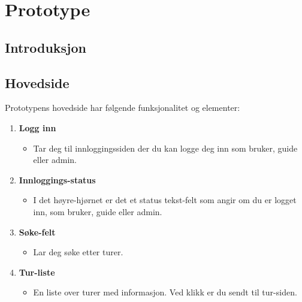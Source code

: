\documentclass[../doc]{subfiles}
\begin{document}
\section{Prototype}
\subsection{Introduksjon}

\subsection{Hovedside}
Prototypens hovedside har følgende funksjonalitet og elementer:

\begin{enumerate}
    \item \textbf{Logg inn}
    \begin{itemize}
        \item Tar deg til innloggingssiden der du kan logge deg inn som bruker, guide eller admin.
    \end{itemize}

    \item \textbf{Innloggings-status}
    \begin{itemize}
        \item I det høyre-hjørnet er det et status tekst-felt som angir om du er logget inn, som bruker, guide eller admin.
    \end{itemize}

    \item \textbf{Søke-felt}
    \begin{itemize}
        \item Lar deg søke etter turer.
    \end{itemize}

    \item \textbf{Tur-liste}
    \begin{itemize}
        \item En liste over turer med informasjon. Ved klikk er du sendt til tur-siden.
    \end{itemize}
\end{enumerate}
\end{document}
